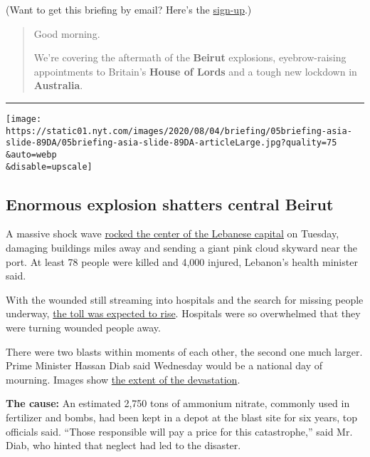 (Want to get this briefing by email? Here's the
\href{https://www.nytimes.com/morning-briefing}{sign-up}.)

\begin{quote}
Good morning.

We're covering the aftermath of the \textbf{Beirut} explosions,
eyebrow-raising appointments to Britain's \textbf{House of Lords} and a
tough new lockdown in \textbf{Australia}.
\end{quote}

\begin{center}\rule{0.5\linewidth}{\linethickness}\end{center}

\texttt{[image: https://static01.nyt.com/images/2020/08/04/briefing/05briefing-asia-slide-89DA/05briefing-asia-slide-89DA-articleLarge.jpg?quality=75\\\&auto=webp\\\&disable=upscale]}

\hypertarget{enormous-explosion-shatters-central-beirut}{%
\subsection{Enormous explosion shatters central
Beirut}\label{enormous-explosion-shatters-central-beirut}}

A massive shock wave
\href{https://www.nytimes.com/2020/08/04/world/middleeast/beirut-explosion-blast.html?action=click\&module=Top\%20Stories\&pgtype=Homepage}{rocked
the center of the Lebanese capital} on Tuesday, damaging buildings miles
away and sending a giant pink cloud skyward near the port. At least 78
people were killed and 4,000 injured, Lebanon's health minister said.

With the wounded still streaming into hospitals and the search for
missing people underway,
\href{https://www.nytimes.com/2020/08/04/world/middleeast/beirut-explosion-blast.html?action=click\&module=Top\%20Stories\&pgtype=Homepage}{the
toll was expected to rise}. Hospitals were so overwhelmed that they were
turning wounded people away.

There were two blasts within moments of each other, the second one much
larger. Prime Minister Hassan Diab said Wednesday would be a national
day of mourning. Images show
\href{https://www.nytimes.com/2020/08/04/world/middleeast/beirut-lebanon-explosions-photos.html}{the
extent of the devastation}.

\textbf{The cause:} An estimated 2,750 tons of ammonium nitrate,
commonly used in fertilizer and bombs, had been kept in a depot at the
blast site for six years, top officials said. ``Those responsible will
pay a price for this catastrophe,'' said Mr. Diab, who hinted that
neglect had led to the disaster.

